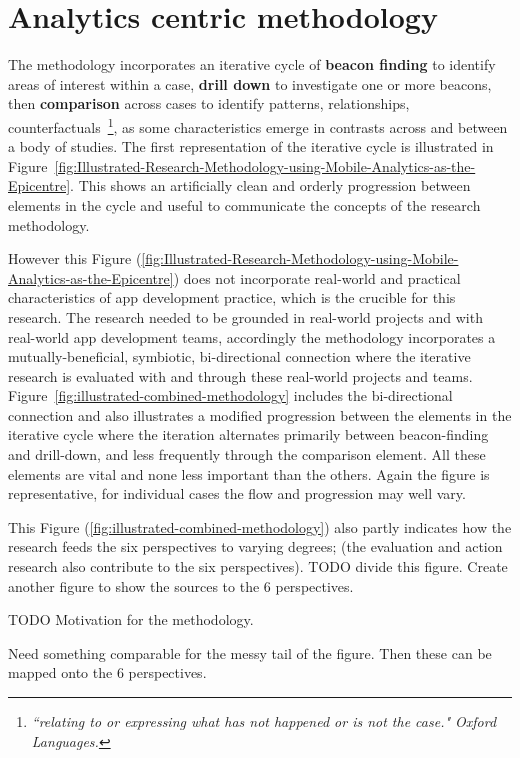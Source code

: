\section{Analytics centric methodology}
The methodology incorporates an iterative cycle of \textbf{beacon finding} to identify areas of interest within a case, \textbf{drill down} to investigate one or more beacons, then \textbf{comparison} across cases to identify patterns, relationships, counterfactuals~\footnote{\emph{``relating to or expressing what has not happened or is not the case." Oxford Languages.}}, as some characteristics emerge in contrasts across and between a body of studies. The first representation of the iterative cycle is illustrated in Figure~\ref{fig:Illustrated-Research-Methodology-using-Mobile-Analytics-as-the-Epicentre}. This shows an artificially clean and orderly progression between elements in the cycle and useful to communicate the concepts of the research methodology. 

However this Figure (\ref{fig:Illustrated-Research-Methodology-using-Mobile-Analytics-as-the-Epicentre}) does not incorporate real-world and practical characteristics of app development practice, which is the crucible for this research. The research needed to be grounded in real-world projects and with real-world app development teams, accordingly the methodology incorporates a mutually-beneficial, symbiotic, bi-directional connection where the iterative research is evaluated with and through these real-world projects and teams. Figure~\ref{fig:illustrated-combined-methodology} includes the bi-directional connection and also illustrates a modified progression between the elements in the iterative cycle where the iteration alternates primarily between beacon-finding and drill-down, and less frequently through the comparison element. All these elements are vital and none less important than the others. Again the figure is representative, for individual cases the flow and progression may well vary.

This Figure (\ref{fig:illustrated-combined-methodology}) also partly indicates how the research feeds the six perspectives to varying degrees; (the evaluation and action research also contribute to the six perspectives). TODO divide this figure. Create another figure to show the sources to the 6 perspectives. 

TODO Motivation for the methodology. 

Need something comparable for the messy tail of the figure. Then these can be mapped onto the 6 perspectives. 

